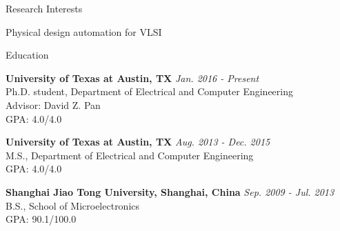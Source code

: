 \documentclass{resume} %
\begin{document}

\begin{rSection}{Research Interests}

Physical design automation for VLSI

\end{rSection}




\begin{rSection}{Education}

{\bf University of Texas at Austin, TX} \hfill {\em Jan. 2016 - Present} \\ 
Ph.D. student, Department of Electrical and Computer Engineering \\
Advisor: David Z. Pan \\
GPA: 4.0/4.0

{\bf University of Texas at Austin, TX} \hfill {\em Aug. 2013 - Dec. 2015} \\ 
M.S., Department of Electrical and Computer Engineering \\
GPA: 4.0/4.0

{\bf Shanghai Jiao Tong University, Shanghai, China} \hfill {\em Sep. 2009 - Jul. 2013} \\ 
B.S., School of Microelectronics \\
GPA: 90.1/100.0

\end{rSection}

\end{document}

